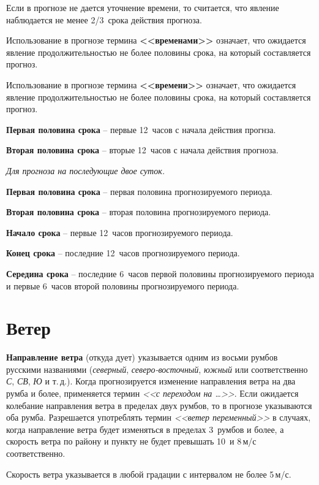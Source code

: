 \documentclass[a4paper, 12pt, twoside, final, book, russian, fittopage, cyremdash, openright]{ncc}
\newcommand{\mps}{\,м/с\xspace}
\begin{document}
Если в прогнозе не дается уточнение времени, то считается, что явление
наблюдается не менее 2/3~срока действия прогноза.

Использование в прогнозе термина \textbf{<<временами>>} означает, что ожидается
явление продолжительностью не более половины срока, на который
составляется прогноз.

Использование в прогнозе термина \textbf{<<времени>>} означает, что ожидается
явление продолжительностью не более половины срока, на который
составляется прогноз.

\textbf{Первая половина срока} \--- первые 12~часов с начала действия прогнза.

\textbf{Вторая половина срока} \--- вторые 12~часов с начала действия прогноза.

\textit{Для прогноза на последующие двое суток.}

\textbf{Первая половина срока} \--- первая половина прогнозируемого периода.

\textbf{Вторая половина срока} \--- вторая половина прогнозируемого периода.

\textbf{Начало срока} \--- первые 12~часов прогнозируемого периода.

\textbf{Конец срока} \--- последние 12~часов прогнозируемого периода.

\textbf{Середина срока} \--- последние 6~часов первой половины прогнозируемого
периода и первые 6~часов второй половины прогнозируемого периода.

\section{Ветер}
\label{sec:wind_p}

\textbf{Направление ветра} (откуда дует) указывается одним из восьми
румбов русскими названиями (\textit{северный}, \textit{северо-восточный}, \textit{южный} или
соответственно \textit{С}, \textit{СВ}, \textit{Ю} и т.\,д.).
Когда прогнозируется изменение
направления ветра на два румба и более, применяется термин \textit{<<с
переходом на \ldots>>}. Если ожидается колебание направления ветра в
пределах двух румбов, то в прогнозе указываются оба румба. Разрешается
употреблять термин \textit{<<ветер переменный>>} в случаях, когда направление
ветра будет изменяться в пределах 3~румбов и более, а скорость ветра
по району и пункту не будет превышать 10~и 8\mps соответственно.

Скорость ветра указывается в любой градации с интервалом не более 5\mps.
\end{document}
